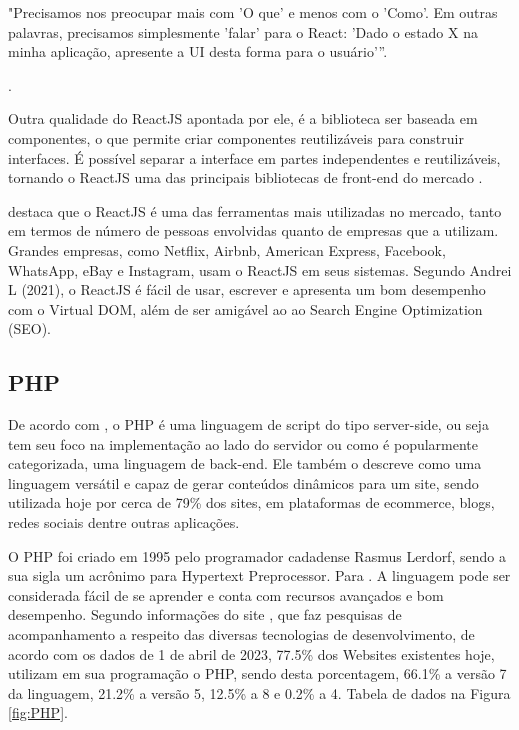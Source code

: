 \begin{citacao}
"Precisamos nos preocupar mais com 'O que' e menos com o 'Como'. Em outras palavras, precisamos simplesmente 'falar' para o React: 'Dado o estado X na minha aplicação, apresente a UI desta forma para o usuário'”\cite{Prata}.
\end{citacao}.

Outra qualidade do ReactJS apontada por ele, é a biblioteca ser baseada em componentes, o que permite criar componentes reutilizáveis para construir interfaces. É possível separar a interface em partes independentes e reutilizáveis, tornando o ReactJS uma das principais bibliotecas de front-end do mercado \cite{Prata}.

 destaca que o ReactJS é uma das ferramentas mais utilizadas no mercado, tanto em termos de número de pessoas envolvidas quanto de empresas que a utilizam. Grandes empresas, como Netflix, Airbnb, American Express, Facebook, WhatsApp, eBay e Instagram, usam o ReactJS em seus sistemas. Segundo Andrei L (2021), o ReactJS é fácil de usar, escrever e apresenta um bom desempenho com o Virtual \gls{DOM}, além de ser amigável ao ao Search Engine Optimization (\gls{SEO}).

\subsection{PHP}
De acordo com , o PHP é uma linguagem de script do tipo server-side, ou seja tem seu foco na implementação ao lado do servidor ou como é popularmente categorizada, uma linguagem de back-end. Ele também o descreve como uma linguagem versátil e capaz de gerar conteúdos dinâmicos para um site, sendo utilizada hoje por cerca de 79\% dos sites, em plataformas de ecommerce, blogs, redes sociais dentre outras aplicações.

O PHP foi criado em 1995 pelo programador cadadense Rasmus Lerdorf, sendo a sua sigla um acrônimo para Hypertext Preprocessor. Para . A linguagem pode ser considerada fácil de se aprender e conta com recursos avançados e bom desempenho. Segundo informações do site , que faz pesquisas de acompanhamento a respeito das diversas tecnologias de desenvolvimento, de acordo com os dados de 1 de abril de 2023, 77.5\% dos Websites existentes hoje, utilizam em sua programação o PHP, sendo desta porcentagem, 66.1\% a versão 7 da linguagem, 21.2\% a versão 5, 12.5\% a 8 e 0.2\% a 4. Tabela de dados na Figura \ref{fig:PHP}.

